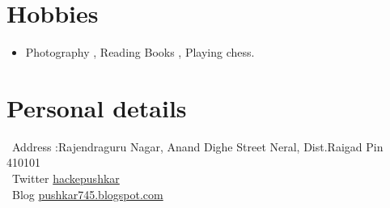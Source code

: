 \documentclass[a4paper,12pt]{article}
\begin{document}
\section{Hobbies}
\begin{itemize}
    \item[\ding{69}]Photography , Reading Books , Playing chess.
\end{itemize}
\section{Personal details}
\begin{minipage}[ht]{0.64\textwidth}  
\faAddressCard \ Address :Rajendraguru Nagar, Anand Dighe Street Neral, Dist.Raigad Pin 410101 \\ 


\faTwitter\ Twitter \href{https://twitter.com/hackepushkar} {hackepushkar} \\

\faBlogger \ Blog \href{https://www.pushkar745.blogspot.com/} {pushkar745.blogspot.com}  
\end{minipage} 
\vfill
{}
\end{document}
